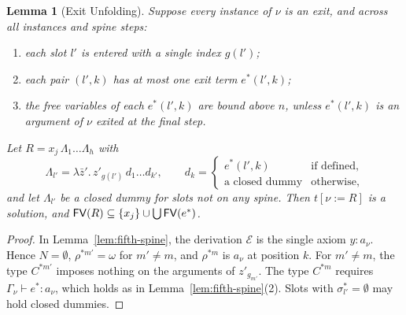 \documentclass[10pt,a4paper]{article}
\theoremstyle{plain}%
\newtheorem{lemma}[theorem]{Lemma}
\begin{document}
\begin{lemma}[Exit Unfolding]\label{lem:fifth-exit}
Suppose every instance of $\nu$ is an exit, and across all instances and spine steps:
\begin{enumerate}
\item[(i)] each slot $l'$ is entered with a single index $g(l')$;
\item[(ii)] each pair $(l', k)$ has at most one exit term $e^*(l',k)$;
\item[(iii)] the free variables of each $e^*(l',k)$ are bound above $n$, unless $e^*(l',k)$ is an argument of $\nu$ exited at the final step.
\end{enumerate}
Let $R = x_j\,\Lambda_1\ldots\Lambda_h$ with
\[
\Lambda_{l'} = \lambda \bar z'.\,z'_{g(l')}\,d_1\ldots d_{k'},
\qquad
d_k =
\begin{cases}
e^*(l',k) & \text{if defined,}\\
\text{a closed dummy} & \text{otherwise,}
\end{cases}
\]
and let $\Lambda_{l'}$ be a closed dummy for slots not on any spine.
Then $t[\nu := R]$ is a solution, and $\mathsf{FV}(R) \subseteq \{x_j\} \cup \bigcup \mathsf{FV}(e^*)$.
\end{lemma}

\begin{proof}
In Lemma~\ref{lem:fifth-spine}, the derivation $\mathcal{E}$ is the single axiom $y : a_\nu$.
Hence $N = \emptyset$, $\rho^{*m'} = \omega$ for $m' \neq m$, and $\rho^{*m}$ is $a_\nu$ at position $k$.
For $m' \neq m$, the type $C^{*m'}$ imposes nothing on the arguments of $z'_{g_{m'}}$.
The type $C^{*m}$ requires $\Gamma_\nu \vdash e^* : a_\nu$, which holds as in Lemma~\ref{lem:fifth-spine}(2).
Slots with $\sigma^*_{l'} = \emptyset$ may hold closed dummies.
\end{proof}
\end{document}

